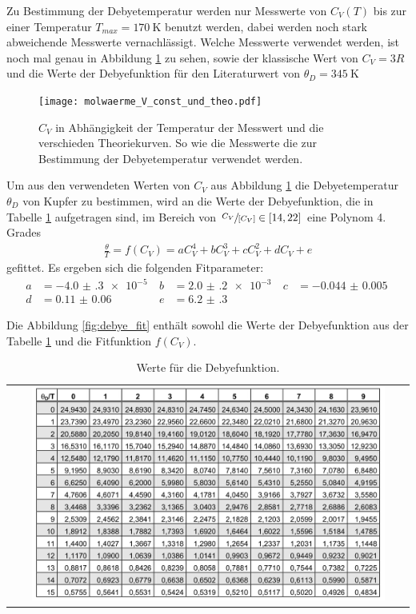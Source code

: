 Zu Bestimmung der Debyetemperatur werden nur Messwerte von $C_V(T)$ bis zur einer Temperatur $T_{max}=\SI{170}{\kelvin} $ benutzt werden, dabei werden noch stark abweichende Messwerte vernachlässigt.
Welche Messwerte verwendet werden, ist noch mal genau in Abbildung \ref{fig:cool} zu sehen, sowie
der klassische Wert von $C_V=3R$ und die Werte der Debyefunktion
für den Literaturwert von $\theta_D = \SI{345}{\kelvin}$  \cite{debyetemp}


\begin{figure}
 \centering
 \texttt{[image: molwaerme\_V\_const\_und\_theo.pdf]}
   \caption{ $C_V$ in Abhängigkeit der Temperatur der Messwert und die verschieden Theoriekurven. So wie die Messwerte die zur Bestimmung der Debyetemperatur verwendet werden.}
   \label{fig:cool}
 \end{figure}

 Um aus den verwendeten Werten von $C_V$ aus Abbildung \ref{fig:cool} die Debyetemperatur $\theta_D$ von Kupfer zu bestimmen,
 wird an die Werte der Debyefunktion, die in Tabelle \ref{fig:debye} aufgetragen sind, im Bereich von $\sfrac{C_V}{[C_V]}  \in [14,22]$
 eine Polynom 4. Grades
 \begin{align}
\frac{\theta}{T}  = f(C_V) = a C_V^4 + b  C_V^3 + c  C_V^2 + d C_V + e
 \end{align}
 gefittet.
 Es ergeben sich die folgenden Fitparameter:
 \begin{align}
 a&=\SI{-4.0(3)e-5}{}    & b&=\SI{2.0(2)e-3}{}   & c &=\SI{-0.044(5)}{}  \\
 d&=\SI{0.11(6)}{}    & e&=\SI{6.2(3)}{}
 \end{align}

 Die Abbildung \ref{fig:debye_fit} enthält sowohl
 die Werte der Debyefunktion
 aus der Tabelle \ref{fig:debye} und die Fitfunktion
 $f(C_V)$.

 \begin{table}
  \centering
  \caption{Werte für die Debyefunktion.}
  \label{fig:debye}
\begin{tabular}{c}
  \includegraphics[width=0.9\textwidth]{Debye.PNG}
\end{tabular}
\end{table}

